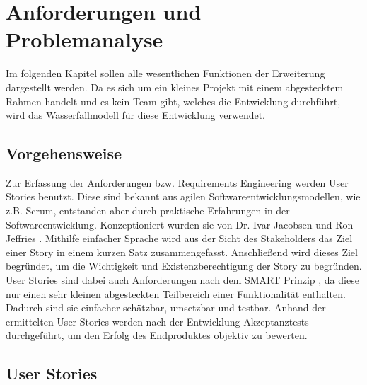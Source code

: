 \chapter{Anforderungen und Problemanalyse}
\label{ch:anforderungen}

Im folgenden Kapitel sollen alle wesentlichen Funktionen der Erweiterung dargestellt werden. Da es sich um ein kleines Projekt mit einem abgestecktem Rahmen handelt und es kein Team gibt, welches die Entwicklung durchführt, wird das Wasserfallmodell für diese Entwicklung verwendet.


\section{Vorgehensweise}

Zur Erfassung der Anforderungen bzw. Requirements Engineering werden User Stories benutzt. Diese sind bekannt aus agilen Softwareentwicklungsmodellen, wie z.B. Scrum, entstanden aber durch praktische Erfahrungen in der Softwareentwicklung. Konzeptioniert wurden sie von Dr. Ivar Jacobsen \cite{Jacobson2016} und Ron Jeffries \cite{Jeffries2022}. Mithilfe einfacher Sprache wird aus der Sicht des Stakeholders das Ziel einer Story in einem kurzen Satz zusammengefasst. Anschließend wird dieses Ziel begründet, um die Wichtigkeit und Existenzberechtigung der Story zu begründen. User Stories sind dabei auch Anforderungen nach dem SMART Prinzip \cite{Witte2016}, da diese nur einen sehr kleinen abgesteckten Teilbereich einer Funktionalität enthalten. Dadurch sind sie einfacher schätzbar, umsetzbar und testbar.
Anhand der ermittelten User Stories werden nach der Entwicklung Akzeptanztests durchgeführt, um den Erfolg des Endproduktes objektiv zu bewerten.

\section{User Stories}

